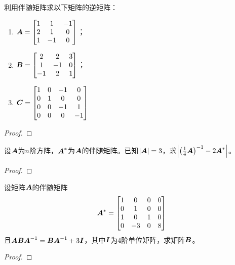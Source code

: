 \begin{problem}
利用伴随矩阵求以下矩阵的逆矩阵：
\begin{enumerate}
    \item \(\boldsymbol{A}=\begin{bmatrix}
              1 & 1  & -1 \\
              2 & 1  & 0  \\
              1 & -1 & 0
          \end{bmatrix}\)；
    \item \(\boldsymbol{B}=\begin{bmatrix}
              2  & 2  & 3 \\
              1  & -1 & 0 \\
              -1 & 2  & 1
          \end{bmatrix}\)；
    \item \(\boldsymbol{C}=\begin{bmatrix}
              1 & 0 & -1 & 0  \\
              0 & 1 & 0  & 0  \\
              0 & 0 & -1 & 1  \\
              0 & 0 & 0  & -1
          \end{bmatrix}\)
\end{enumerate}
\end{problem}
\begin{proof}
\end{proof}

\begin{problem}
设\(\boldsymbol{A}\)为\(n\)阶方阵，\(\boldsymbol{A}^*\)为\(\boldsymbol{A}\)的伴随矩阵。已知\(\left|\boldsymbol{A} \right|=3\)，求\(\left|{\left( \frac{1}{4}\boldsymbol{A} \right)}^{-1}-2\boldsymbol{A}^* \right|\)。
\end{problem}
\begin{proof}
\end{proof}

\begin{problem}
设矩阵\(\boldsymbol{A}\)的伴随矩阵
\begin{equation*}
    \boldsymbol{A}^*=
    \begin{bmatrix}
        1 & 0  & 0 & 0 \\
        0 & 1  & 0 & 0 \\
        1 & 0  & 1 & 0 \\
        0 & -3 & 0 & 8
    \end{bmatrix}
\end{equation*}
且\(\boldsymbol{A}\boldsymbol{B}{\boldsymbol{A}}^{-1}=\boldsymbol{B}{\boldsymbol{A}}^{-1}+3\boldsymbol{I}\)，其中\(\boldsymbol{I}\)为\(4\)阶单位矩阵，求矩阵\(\boldsymbol{B}\)。
\end{problem}
\begin{proof}
\end{proof}

